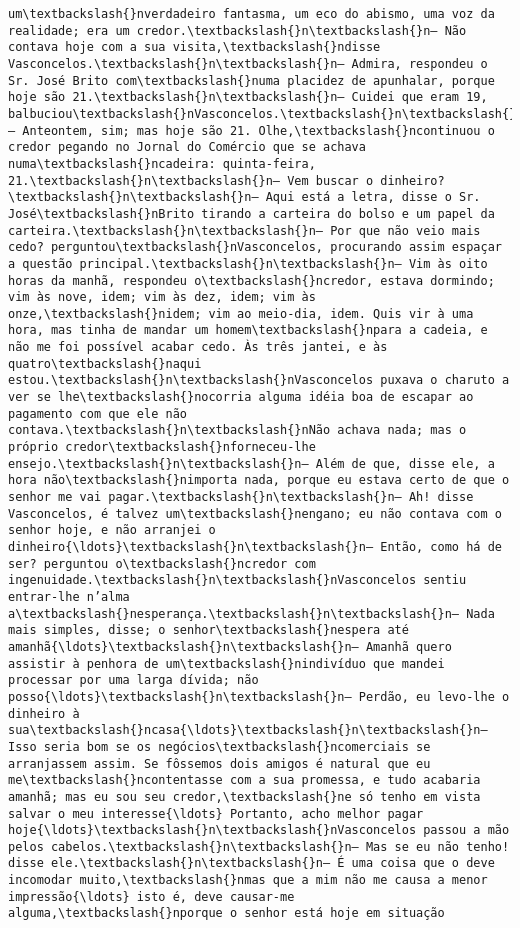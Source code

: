 \documentclass[11pt]{article}
\begin{document}
\begin{Verbatim}[commandchars=\\\{\}]
um\textbackslash{}nverdadeiro fantasma, um eco do abismo, uma voz da realidade; era um credor.\textbackslash{}n\textbackslash{}n— Não contava hoje com a sua visita,\textbackslash{}ndisse Vasconcelos.\textbackslash{}n\textbackslash{}n— Admira, respondeu o Sr. José Brito com\textbackslash{}numa placidez de apunhalar, porque hoje são 21.\textbackslash{}n\textbackslash{}n— Cuidei que eram 19, balbuciou\textbackslash{}nVasconcelos.\textbackslash{}n\textbackslash{}n— Anteontem, sim; mas hoje são 21. Olhe,\textbackslash{}ncontinuou o credor pegando no Jornal do Comércio que se achava numa\textbackslash{}ncadeira: quinta-feira, 21.\textbackslash{}n\textbackslash{}n— Vem buscar o dinheiro?\textbackslash{}n\textbackslash{}n— Aqui está a letra, disse o Sr. José\textbackslash{}nBrito tirando a carteira do bolso e um papel da carteira.\textbackslash{}n\textbackslash{}n— Por que não veio mais cedo? perguntou\textbackslash{}nVasconcelos, procurando assim espaçar a questão principal.\textbackslash{}n\textbackslash{}n— Vim às oito horas da manhã, respondeu o\textbackslash{}ncredor, estava dormindo; vim às nove, idem; vim às dez, idem; vim às onze,\textbackslash{}nidem; vim ao meio-dia, idem. Quis vir à uma hora, mas tinha de mandar um homem\textbackslash{}npara a cadeia, e não me foi possível acabar cedo. Às três jantei, e às quatro\textbackslash{}naqui estou.\textbackslash{}n\textbackslash{}nVasconcelos puxava o charuto a ver se lhe\textbackslash{}nocorria alguma idéia boa de escapar ao pagamento com que ele não contava.\textbackslash{}n\textbackslash{}nNão achava nada; mas o próprio credor\textbackslash{}nforneceu-lhe ensejo.\textbackslash{}n\textbackslash{}n— Além de que, disse ele, a hora não\textbackslash{}nimporta nada, porque eu estava certo de que o senhor me vai pagar.\textbackslash{}n\textbackslash{}n— Ah! disse Vasconcelos, é talvez um\textbackslash{}nengano; eu não contava com o senhor hoje, e não arranjei o dinheiro{\ldots}\textbackslash{}n\textbackslash{}n— Então, como há de ser? perguntou o\textbackslash{}ncredor com ingenuidade.\textbackslash{}n\textbackslash{}nVasconcelos sentiu entrar-lhe n’alma a\textbackslash{}nesperança.\textbackslash{}n\textbackslash{}n— Nada mais simples, disse; o senhor\textbackslash{}nespera até amanhã{\ldots}\textbackslash{}n\textbackslash{}n— Amanhã quero assistir à penhora de um\textbackslash{}nindivíduo que mandei processar por uma larga dívida; não posso{\ldots}\textbackslash{}n\textbackslash{}n— Perdão, eu levo-lhe o dinheiro à sua\textbackslash{}ncasa{\ldots}\textbackslash{}n\textbackslash{}n— Isso seria bom se os negócios\textbackslash{}ncomerciais se arranjassem assim. Se fôssemos dois amigos é natural que eu me\textbackslash{}ncontentasse com a sua promessa, e tudo acabaria amanhã; mas eu sou seu credor,\textbackslash{}ne só tenho em vista salvar o meu interesse{\ldots} Portanto, acho melhor pagar hoje{\ldots}\textbackslash{}n\textbackslash{}nVasconcelos passou a mão pelos cabelos.\textbackslash{}n\textbackslash{}n— Mas se eu não tenho! disse ele.\textbackslash{}n\textbackslash{}n— É uma coisa que o deve incomodar muito,\textbackslash{}nmas que a mim não me causa a menor impressão{\ldots} isto é, deve causar-me alguma,\textbackslash{}nporque o senhor está hoje em situação 
\end{Verbatim}
\end{document}
